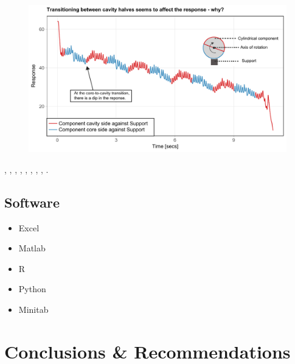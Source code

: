 \documentclass[11pt,a4paper,article]{memoir} %
\begin{document}
\begin{figure}
\includegraphics[width=\textwidth]{annotated_line_chart.pdf}
\end{figure}

\cite{hastie2013elements}, \cite{gelman2013bayesian}, \cite{faraway2004linear}, \cite{blitzstein2014linear}, \cite{jaynes2003probability}, \cite{wickham2009ggplot2}, \cite{montgomery2000design}, \cite{kruschke2015doing}, \cite{iso2014statistical}.


\section{Software}
\begin{itemize}
\item Excel
\item Matlab
\item R
\item Python
\item Minitab
\end{itemize}

\newpage


\chapter{Conclusions \& Recommendations}


\newpage



\newpage
\appendix
\chapter{}
\end{document}
